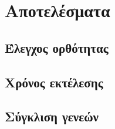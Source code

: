 \chapter{Αποτελέσματα}
\section{Έλεγχος ορθότητας}
\section{Χρόνος εκτέλεσης}
\section{Σύγκλιση γενεών}